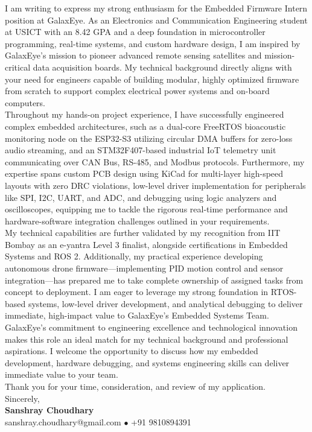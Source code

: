 \documentclass[10pt,a4paper]{article}%
\begin{document}
\noindent I am writing to express my strong enthusiasm for the Embedded Firmware Intern position at GalaxEye. As an Electronics and Communication Engineering student at USICT with an 8.42 GPA and a deep foundation in microcontroller programming, real-time systems, and custom hardware design, I am inspired by GalaxEye's mission to pioneer advanced remote sensing satellites and mission-critical data acquisition boards. My technical background directly aligns with your need for engineers capable of building modular, highly optimized firmware from scratch to support complex electrical power systems and on-board computers.
\vspace{8pt}\\
Throughout my hands-on project experience, I have successfully engineered complex embedded architectures, such as a dual-core FreeRTOS bioacoustic monitoring node on the ESP32-S3 utilizing circular DMA buffers for zero-loss audio streaming, and an STM32F407-based industrial IoT telemetry unit communicating over CAN Bus, RS-485, and Modbus protocols. Furthermore, my expertise spans custom PCB design using KiCad for multi-layer high-speed layouts with zero DRC violations, low-level driver implementation for peripherals like SPI, I2C, UART, and ADC, and debugging using logic analyzers and oscilloscopes, equipping me to tackle the rigorous real-time performance and hardware-software integration challenges outlined in your requirements.
\vspace{8pt}\\
My technical capabilities are further validated by my recognition from IIT Bombay as an e-yantra Level 3 finalist, alongside certifications in Embedded Systems and ROS 2. Additionally, my practical experience developing autonomous drone firmware—implementing PID motion control and sensor integration—has prepared me to take complete ownership of assigned tasks from concept to deployment. I am eager to leverage my strong foundation in RTOS-based systems, low-level driver development, and analytical debugging to deliver immediate, high-impact value to GalaxEye's Embedded Systems Team. \vspace{8pt}\\

\noindent GalaxEye's commitment to engineering excellence and technological innovation makes this role an ideal match for my technical background and professional aspirations. I welcome the opportunity to discuss how my embedded development, hardware debugging, and systems engineering skills can deliver immediate value to your team. \vspace{8pt}\\%

\noindent Thank you for your time, consideration, and review of my application. \vspace{18pt}\\%

\noindent Sincerely, \vspace{8pt}\\%
\textbf{Sanshray Choudhary} \\%
sanshray.choudhary@gmail.com $\bullet$ +91 9810894391 \\%
\end{document}
